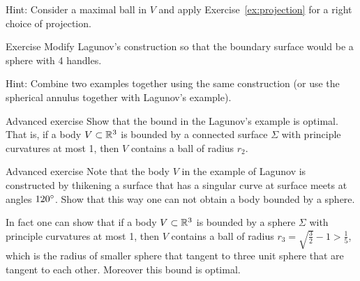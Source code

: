 Hint: Consider a maximal ball in $V$ and apply Exercise~\ref{ex:projection} for a right choice of projection.



\begin{thm}{Exercise}
Modify Lagunov's construction so that the boundary surface would be a sphere with 4 handles.
\end{thm}

Hint: Combine two examples together using the same construction (or use the spherical annulus together with Lagunov's example).

\begin{thm}{Advanced exercise}
Show that the bound in the Lagunov's example is optimal.
That is, if a body $V\subset \mathbb{R}^3$ is bounded by a connected surface  $\Sigma$ with principle curvatures at most 1, then $V$ contains a ball of radius $r_2$.
\end{thm}


\begin{thm}{Advanced exercise}
Note that the body $V$ in the example of Lagunov is constructed by thikening a surface that has a singular curve at surface meets at angles $120\degree$.
Show that this way one can not obtain a body bounded by a sphere.
\end{thm}

In fact one can show that if a body $V\subset \mathbb{R}^3$ is bounded by a sphere $\Sigma$ with principle curvatures at most 1, then $V$ contains a ball of radius $r_3=\sqrt{\tfrac32}-1>\tfrac15$,
which is the radius of smaller sphere that tangent to three unit sphere that are tangent to each other.
Moreover this bound is optimal.
